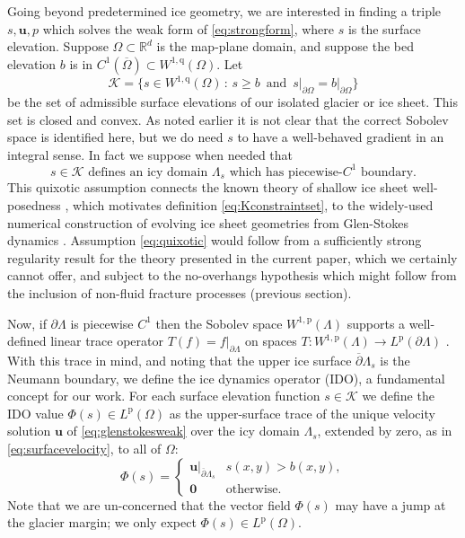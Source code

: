 \documentclass[letterpaper,final,12pt,reqno]{amsart}
\theoremstyle{claim}
\newcommand{\RR}{\mathbb{R}}
\newcommand{\bu}{\mathbf{u}}
\newcommand{\bzero}{\bm{0}}
\newcommand{\pp}{{\text{p}}}
\newcommand{\qq}{{\text{q}}}
\numberwithin{equation}{section}
\numberwithin{figure}{section}
\numberwithin{table}{section}
\numberwithin{theorem}{section}
\begin{document}
Going beyond predetermined ice geometry, we are interested in finding a triple $s,\bu,p$ which solves the weak form of \eqref{eq:strongform}, where $s$ is the surface elevation.  Suppose $\Omega \subset \RR^d$ is the map-plane domain, and suppose the bed elevation $b$ is in $C^1(\overline{\Omega}) \subset W^{1,\qq}(\Omega)$.  Let
\begin{equation}
\mathcal{K} = \{s \in W^{1,\qq}(\Omega) \,:\, s \ge b \, \text{ and } \, s\big|_{\partial\Omega} = b\big|_{\partial\Omega}\}  \label{eq:Kconstraintset}
\end{equation}
be the set of admissible surface elevations of our isolated glacier or ice sheet.  This set is closed and convex.  As noted earlier it is not clear that the correct Sobolev space is identified here, but we do need $s$ to have a well-behaved gradient in an integral sense.  In fact we suppose when needed that
\begin{equation}
s\in \mathcal{K} \text{ defines an icy domain } \Lambda_s \text{ which has piecewise-$C^1$ boundary.} \label{eq:quixotic}
\end{equation}
This quixotic assumption connects the known theory of shallow ice sheet well-posedness \cite{JouvetBueler2012}, which motivates definition \eqref{eq:Kconstraintset}, to the widely-used numerical construction of evolving ice sheet geometries from Glen-Stokes dynamics \cite{Jouvetetal2008,Lengetal2012}.  Assumption \eqref{eq:quixotic} would follow from a sufficiently strong regularity result for the theory presented in the current paper, which we certainly cannot offer, and subject to the no-overhangs hypothesis which might follow from the inclusion of non-fluid fracture processes (previous section).

Now, if $\partial \Lambda$ is piecewise $C^1$ then the Sobolev space $W^{1,\pp}(\Lambda)$ supports a well-defined linear trace operator $T(f) = f|_{\partial \Lambda}$ on spaces $T:W^{1,\pp}(\Lambda) \to L^\pp(\partial \Lambda)$ \cite[Section 5.5]{Evans2010}.  With this trace in mind, and noting that the upper ice surface $\overline{\partial} \Lambda_s$ is the Neumann boundary, we define the ice dynamics operator (IDO), a fundamental concept for our work.  For each surface elevation function $s \in \mathcal{K}$ we define the IDO value $\Phi(s) \in L^\pp(\Omega)$ as the upper-surface trace of the unique velocity solution $\bu$ of \eqref{eq:glenstokesweak} over the icy domain $\Lambda_s$, extended by zero, as in \eqref{eq:surfacevelocity}, to all of $\Omega$:
\begin{equation}
\Phi(s) = \begin{cases} \bu\big|_{\overline{\partial} \Lambda_s} & s(x,y) > b(x,y), \\
                        \bzero & \text{otherwise}. \end{cases} \label{eq:ido}
\end{equation}
Note that we are un-concerned that the vector field $\Phi(s)$ may have a jump at the glacier margin; we only expect $\Phi(s) \in L^\pp(\Omega)$.
\end{document}
